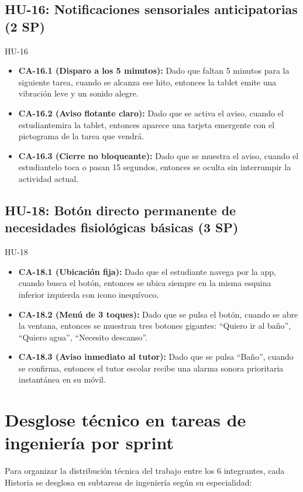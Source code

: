 \documentclass[11pt,a4paper]{article}
\newcommand{\ca}[2]{\item \textbf{#1:} #2}
\begin{document}
\subsection{HU-16: Notificaciones sensoriales anticipatorias (2 SP)}
\begin{criterios}{HU-16}
\begin{itemize}
\ca{CA-16.1 (Disparo a los 5 minutos)}{Dado que faltan 5 minutos para la siguiente tarea, cuando se alcanza ese hito, entonces la tablet emite una vibración leve y un sonido alegre.}
\ca{CA-16.2 (Aviso flotante claro)}{Dado que se activa el aviso, cuando el estudiantemira la tablet, entonces aparece una tarjeta emergente con el pictograma de la tarea que vendrá.}
\ca{CA-16.3 (Cierre no bloqueante)}{Dado que se muestra el aviso, cuando el estudiantelo toca o pasan 15 segundos, entonces se oculta sin interrumpir la actividad actual.}
\end{itemize}
\end{criterios}

\subsection{HU-18: Botón directo permanente de necesidades fisiológicas básicas (3 SP)}
\begin{criterios}{HU-18}
\begin{itemize}
\ca{CA-18.1 (Ubicación fija)}{Dado que el estudiante navega por la app, cuando busca el botón, entonces se ubica siempre en la misma esquina inferior izquierda con icono inequívoco.}
\ca{CA-18.2 (Menú de 3 toques)}{Dado que se pulsa el botón, cuando se abre la ventana, entonces se muestran tres botones gigantes: ``Quiero ir al baño'', ``Quiero agua'', ``Necesito descanso''.}
\ca{CA-18.3 (Aviso inmediato al tutor)}{Dado que se pulsa ``Baño'', cuando se confirma, entonces el tutor escolar recibe una alarma sonora prioritaria instantánea en su móvil.}
\end{itemize}
\end{criterios}

\section{Desglose técnico en tareas de ingeniería por sprint}
Para organizar la distribución técnica del trabajo entre los 6 integrantes, cada Historia se desglosa en subtareas de ingeniería según su especialidad:
\end{document}
